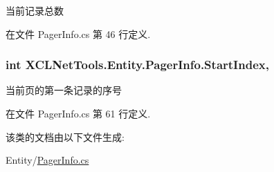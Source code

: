 当前记录总数 



在文件 Pager\-Info.\-cs 第 46 行定义.

\hypertarget{class_x_c_l_net_tools_1_1_entity_1_1_pager_info_a659b36bf635a3fed41ee3b82ec4c2cbe}{
\subsubsection[{Start\-Index}]{\setlength{\rightskip}{0pt plus 5cm}int X\-C\-L\-Net\-Tools.\-Entity.\-Pager\-Info.\-Start\-Index\hspace{0.3cm}{\ttfamily [get]}, {\ttfamily [set]}}}\label{class_x_c_l_net_tools_1_1_entity_1_1_pager_info_a659b36bf635a3fed41ee3b82ec4c2cbe}


当前页的第一条记录的序号 



在文件 Pager\-Info.\-cs 第 61 行定义.



该类的文档由以下文件生成\-:\begin{DoxyCompactItemize}
\item 
Entity/\hyperlink{_pager_info_8cs}{Pager\-Info.\-cs}\end{DoxyCompactItemize}
